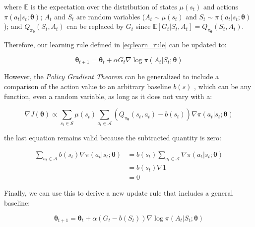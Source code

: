 \documentclass[twoside,twocolumn]{article}
\begin{document}
\noindent where $\mathbb{E}$ is the expectation over the distribution of states $\mu(s_t)$ and actions $\pi (a_t|s_t; \boldsymbol{\theta})$; $A_t$ and $S_t$ are random variables ($A_t \sim \mu(s_t)$ and $S_t \sim \pi (a_t|s_t; \boldsymbol{\theta})$); and $Q_{\pi_{\boldsymbol{\theta}}}(S_t,A_t)$ can be replaced by $G_t$ since $\mathbb{E}[G_t| S_t,A_t] = Q_{\pi_{\boldsymbol{\theta}}}(S_t,A_t)$.

Therefore, our learning rule defined in \ref{eq:learn_rule} can be updated to:

\begin{equation*}
  \boldsymbol{\theta}_{t+1} = \boldsymbol{\theta}_{t} + \alpha G_t \nabla \log{\pi (A_t|S_t; \boldsymbol{\theta})}
\end{equation*}

However, the \emph{Policy Gradient Theorem} can be generalized to include a comparison of the action value to an arbitrary baseline $b(s)$ \cite{Sutton1998}, which can be any function, even a random variable, as long as it does not vary with a:

\begin{equation*}
  \nabla J({\boldsymbol{\theta}}) \propto
  \sum_{s_t \in \mathcal{S}} \mu (s_t) \sum_{a_t \in \mathcal{A}} \left( Q_{\pi_{\boldsymbol{\theta}}}(s_t,a_t) - b(s_t) \right) \nabla \pi (a_t|s_t; \boldsymbol{\theta})
\end{equation*}

the last equation remains valid because the subtracted quantity is zero:

\begin{equation*}
  \begin{split}
    \sum_{a_t \in \mathcal{A}} b(s_t) \nabla \pi (a_t|s_t; \boldsymbol{\theta}) &=
    b(s_t) \sum_{a_t \in \mathcal{A}} \nabla \pi (a_t|s_t; \boldsymbol{\theta})\\
    &= b(s_t) \nabla 1 \\
    &= 0
  \end{split}
\end{equation*}

Finally, we can use this to derive a new update rule that includes a general baseline:

\begin{equation}
  \boldsymbol{\theta}_{t+1} = \boldsymbol{\theta}_{t} + \alpha (G_t - b(S_t)) \nabla \log{\pi (A_t|S_t; \boldsymbol{\theta})}
  \label{eq:learn_rule_bl}
\end{equation}

\end{document}
